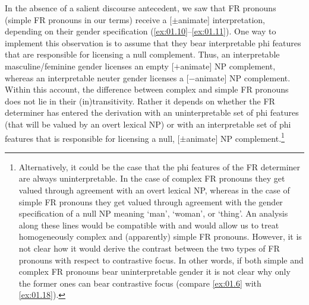 \documentclass[output=paper]{langsci/langscibook}
\begin{document}
In the absence of a salient discourse antecedent, we saw that \gls{FR} pronouns
(simple \gls{FR} pronouns in our
terms) receive a [$\pm$animate] interpretation, depending on their gender
specification (\ref{ex:01.10}--\ref{ex:01.11}). One way to implement
this observation is to assume that they bear interpretable phi features that
are responsible for licensing a null complement. Thus, an interpretable
masculine/feminine gender licenses an empty [$+$animate] NP complement, whereas
an interpretable neuter gender licenses a [$-$animate] NP complement. Within this
account, the difference between complex and simple \gls{FR}
pronouns does not lie in their
(in)transitivity. Rather it depends on whether the \gls{FR} determiner has
entered the derivation with an uninterpretable set of phi features (that will
be valued by an overt lexical NP) or with an interpretable set of phi features
that is responsible for licensing a null, [$\pm$animate] NP
complement.\footnote{Alternatively, it could be the case that the phi features
    of the \gls{FR} determiner are always uninterpretable. In the case of
    complex \gls{FR} pronouns they
    get valued through agreement with an overt lexical NP, whereas in the case
    of simple \gls{FR} pronouns
    they get valued through agreement with the gender specification of a null
    NP meaning ‘man’, ‘woman’, or ‘thing’. An analysis along these lines would
    be compatible with \textcite{Panagiotidis2003} and would allow us to treat
    homogeneously complex and (apparently) simple \gls{FR} pronouns. However,
    it is not clear how it would derive the contrast between the two types of
    \gls{FR} pronouns with respect
    to contrastive focus. In other words, if both
    simple and complex \gls{FR} pronouns bear uninterpretable gender it is not
    clear why only the former ones can bear contrastive
    focus (compare \eqref{ex:01.6} with
\eqref{ex:01.18}).}
\end{document}
